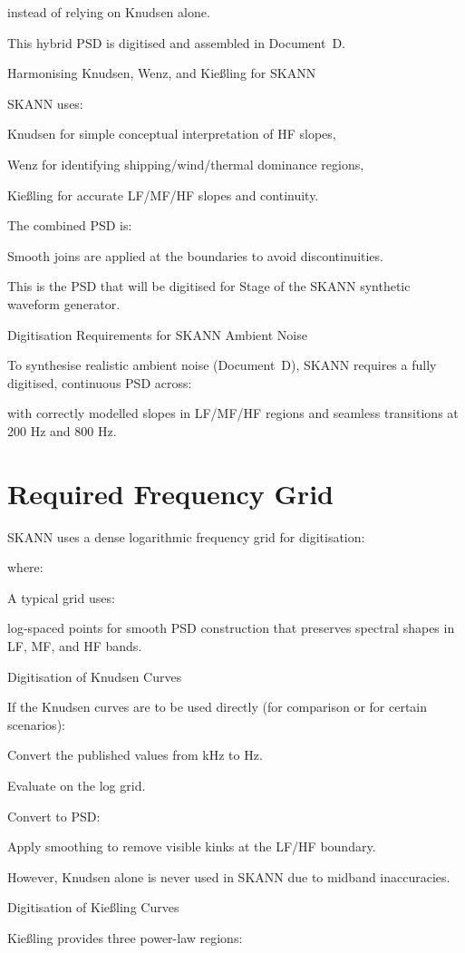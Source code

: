 \documentclass[12pt]{article}
\begin{document}
instead of relying on Knudsen alone.

This hybrid PSD is digitised and assembled in Document D.

Harmonising Knudsen, Wenz, and Kießling for SKANN

SKANN uses:

Knudsen for simple conceptual interpretation of HF slopes,

Wenz for identifying shipping/wind/thermal dominance regions,

Kießling for accurate LF/MF/HF slopes and continuity.

The combined PSD is:


Smooth joins are applied at the boundaries to avoid discontinuities.

This is the PSD that will be digitised for Stage  of the SKANN synthetic waveform generator.

Digitisation Requirements for SKANN Ambient Noise

To synthesise realistic ambient noise (Document D), SKANN requires a fully digitised, continuous PSD  across:


with correctly modelled slopes in LF/MF/HF regions and seamless transitions at 200 Hz and 800 Hz.

\section*{Required Frequency Grid}
SKANN uses a dense logarithmic frequency grid for digitisation:


where:


A typical grid uses:


log-spaced points for smooth PSD construction that preserves spectral shapes in LF, MF, and HF bands.

Digitisation of Knudsen Curves

If the Knudsen curves are to be used directly (for comparison or for certain scenarios):

Convert the published values from kHz to Hz.

Evaluate  on the log grid.

Convert to PSD:


Apply smoothing to remove visible kinks at the LF/HF boundary.

However, Knudsen alone is never used in SKANN due to midband inaccuracies.

Digitisation of Kießling Curves

Kießling provides three power-law regions:
\end{document}
